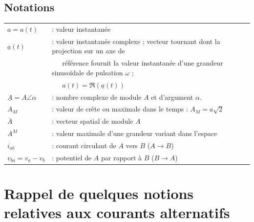 \subsection{Notations}
\begin{tabular}{ll}
	$a = a(t)$                      & : valeur instantanée                                             \\
	$\underline{a}(t)$              & : valeur instantanée complexe ; vecteur tournant                 
	dont la projection sur un axe de\\
	                                & \ \ \  référence fournit la valeur instantanée                 
	d'une grandeur sinusoïdale de pulsation $\omega$ ; \\
	                                & \ \ \	$a(t) = \Re(                                                
	\underline{a}(t))$\\
	$\underline{A} = A\angle\alpha$ & : nombre complexe de module $A$ et                                
	d'argument $\alpha$.\\
	$A_M$                           & : valeur de crête ou maximale dans le temps : $A_M = a \sqrt{2}$ \\
	$\overline{A}$                  & : vecteur spatial de module $A$                                   \\
	$A^M$                           & : valeur maximale d'une grandeur variant dans l'espace            \\
	$i_{ab}$                        & : courant circulant de $A$ vers $B$ ($A\rightarrow B$)            \\
	$v_{ba} = v_a-v_b$              & : potentiel de $A$ par rapport à $B$ ($B \rightarrow A$)         
\end{tabular}

\section{Rappel de quelques notions relatives aux courants alternatifs}
